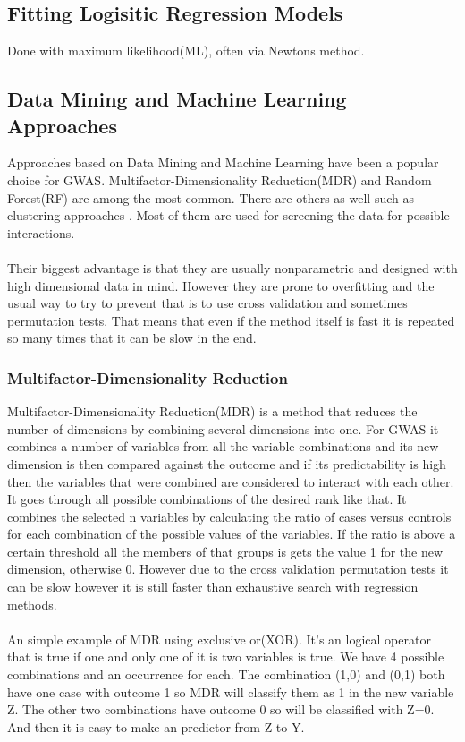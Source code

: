 \documentclass[10pt,a4paper]{report}
\begin{document}
\subsection{Fitting Logisitic Regression Models}
Done with maximum likelihood(ML), often via Newtons method.

\subsection{Data Mining and Machine Learning Approaches}
\label{data_machine_learning}
Approaches based on Data Mining and Machine Learning have been a popular choice for GWAS. Multifactor-Dimensionality Reduction(MDR)\cite{mdr_2001} and Random Forest(RF)\cite{random_forest} are among the most common\cite{gene_enviroment_2013,cordell_detect_review}. There are others as well such as clustering approaches \cite{fast_high_order_cluster}. Most of them are used for screening the data for possible interactions\cite{gene_enviroment_2013,cordell_detect_review}.\\
\\
Their biggest advantage is that they are usually nonparametric and designed with high dimensional data in mind. However they are prone to overfitting and the usual way to try to prevent that is to use cross validation and sometimes permutation tests. That means that even if the method itself is fast it is repeated so many times that it can be slow in the end.\cite{cordell_detect_review}

\subsubsection{Multifactor-Dimensionality Reduction}
Multifactor-Dimensionality Reduction(MDR) is a method that reduces the number of dimensions by combining several dimensions into one. For GWAS it combines a number of variables from all the variable combinations and its new dimension is then compared against the outcome and if its predictability is high then the variables that were combined are considered to interact with each other. It goes through all possible combinations of the desired rank like that. It combines the selected n variables by calculating the ratio of cases versus controls for each combination of the possible values of the variables. If the ratio is above a certain threshold all the members of that groups is gets the value 1 for the new dimension, otherwise 0. However due to the cross validation permutation tests it can be slow however it is still faster than exhaustive search with regression methods.\cite{cordell_detect_review,mdr_2001}\\
\\
An simple example of MDR using exclusive or(XOR). It's an logical operator that is true if one and only one of it is two variables is true. We have 4 possible combinations and an occurrence for each. The combination (1,0) and (0,1) both have one case with outcome 1 so MDR will classify them as 1 in the new variable Z. The other two combinations have outcome 0 so will be classified with Z=0. And then it is easy to make an predictor from Z to Y.
\end{document}
